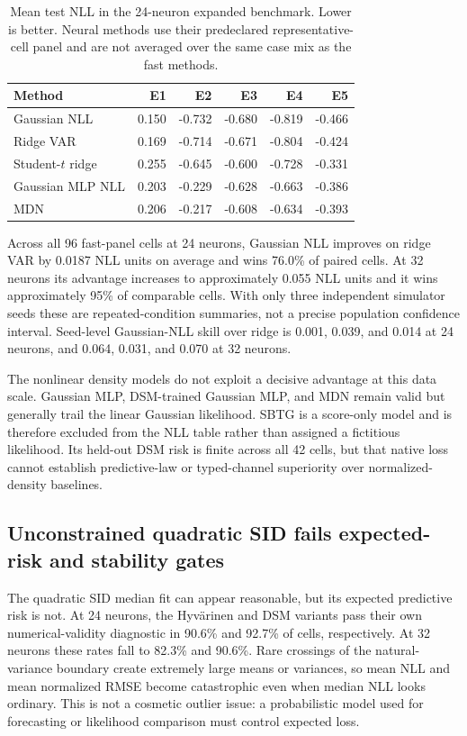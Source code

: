 \begin{table}[ht]
\centering
\caption{Mean test NLL in the 24-neuron expanded benchmark. Lower is better. Neural methods use their predeclared representative-cell panel and are not averaged over the same case mix as the fast methods.}
\label{tab:rethink-nll}
\begin{tabular}{@{}lrrrrr@{}}
\toprule
Method & E1 & E2 & E3 & E4 & E5 \\
\midrule
Gaussian NLL & 0.150 & -0.732 & -0.680 & -0.819 & -0.466 \\
Ridge VAR & 0.169 & -0.714 & -0.671 & -0.804 & -0.424 \\
Student-$t$ ridge & 0.255 & -0.645 & -0.600 & -0.728 & -0.331 \\
Gaussian MLP NLL & 0.203 & -0.229 & -0.628 & -0.663 & -0.386 \\
MDN & 0.206 & -0.217 & -0.608 & -0.634 & -0.393 \\
\bottomrule
\end{tabular}
\end{table}

Across all 96 fast-panel cells at 24 neurons, Gaussian NLL improves on ridge VAR by
0.0187 NLL units on average and wins 76.0\% of paired cells. At 32 neurons its advantage
increases to approximately 0.055 NLL units and it wins approximately 95\% of comparable
cells. With only three independent simulator seeds these are repeated-condition
summaries, not a precise population confidence interval. Seed-level Gaussian-NLL skill
over ridge is 0.001, 0.039, and 0.014 at 24 neurons, and 0.064, 0.031, and 0.070 at 32
neurons.

The nonlinear density models do not exploit a decisive advantage at this data scale.
Gaussian MLP, DSM-trained Gaussian MLP, and MDN remain valid but generally trail the
linear Gaussian likelihood. SBTG is a score-only model and is therefore excluded from
the NLL table rather than assigned a fictitious likelihood. Its held-out DSM risk is
finite across all 42 cells, but that native loss cannot establish predictive-law or
typed-channel superiority over normalized-density baselines.

\subsection{Unconstrained quadratic SID fails expected-risk and stability gates}

The quadratic SID median fit can appear reasonable, but its expected predictive risk is
not. At 24 neurons, the Hyv\"arinen and DSM variants pass their own numerical-validity
diagnostic in 90.6\% and 92.7\% of cells, respectively. At 32 neurons these rates fall to
82.3\% and 90.6\%. Rare crossings of the natural-variance boundary create extremely
large means or variances, so mean NLL and mean normalized RMSE become catastrophic even
when median NLL looks ordinary. This is not a cosmetic outlier issue: a probabilistic
model used for forecasting or likelihood comparison must control expected loss.

